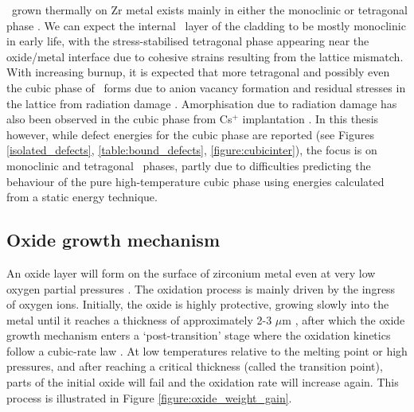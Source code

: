 \zirconia\ grown thermally on Zr metal exists mainly in either the monoclinic or tetragonal phase \cite{Howard1988,teufer1962crystal}. We can expect the internal \zirconia\ layer of the cladding to be mostly monoclinic in early life, with the stress-stabilised tetragonal phase appearing near the oxide/metal interface due to cohesive strains resulting from the lattice mismatch. With increasing burnup, it is expected that more tetragonal and possibly even the cubic phase of \zirconia\ forms due to anion vacancy formation and residual stresses in the lattice from radiation damage \cite{sickafus1999radiation}. Amorphisation due to radiation damage has also been observed in the cubic phase from Cs$^{+}$ implantation \cite{amorphization2000wang}. In this thesis however, while defect energies for the cubic phase are reported (see Figures \ref{isolated_defects}, \ref{table:bound_defects}, \ref{figure:cubicinter}), the focus is on monoclinic and tetragonal \zirconia\ phases, partly due to difficulties predicting the behaviour of the pure high-temperature cubic phase using energies calculated from a static energy technique. 

\subsection{Oxide growth mechanism}

An oxide layer will form on the surface of zirconium metal even at very low oxygen partial pressures \cite{causey2005review}. The oxidation process is mainly driven by the ingress of oxygen ions. Initially, the oxide is highly protective, growing slowly into the metal until it reaches a thickness of approximately 2-3 $\mu$m \cite{garzarolli1991oxide, dawson1968kinetics}, after which the oxide growth mechanism enters a `post-transition' stage where the oxidation kinetics follow a cubic-rate law  \cite{porte1960oxidation}. At low temperatures relative to the melting point or high pressures, and after reaching a critical thickness (called the transition point), parts of the initial oxide will fail and the oxidation rate will increase again. This process is illustrated in Figure \ref{figure:oxide_weight_gain}. 

